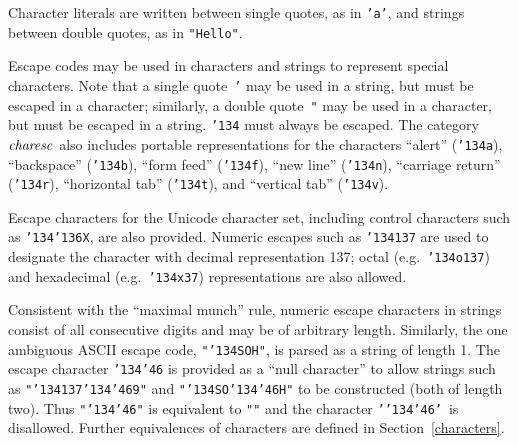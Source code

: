 %
%
%
%
%
%
%
%
%
%
%
%
%
%
%

Character literals are written between single quotes, as in
\mbox{\tt 'a'}, and strings between double quotes, as in \mbox{\tt "Hello"}.

Escape codes may be used in characters and strings to represent
special characters.  Note that a single quote~\mbox{\tt '} may be used in a string, but
must be escaped in a character; similarly, a double quote~\mbox{\tt "} may be used in a
character, but must be escaped in a string.  \mbox{\tt {\char'134}} must always be
escaped.  The category \mbox{$\it charesc$} also includes portable
representations for the characters ``alert'' (\mbox{\tt {\char'134}a}), ``backspace''
(\mbox{\tt {\char'134}b}), ``form feed'' (\mbox{\tt {\char'134}f}), ``new line'' (\mbox{\tt {\char'134}n}), ``carriage return''
(\mbox{\tt {\char'134}r}), ``horizontal tab'' (\mbox{\tt {\char'134}t}), and ``vertical tab'' (\mbox{\tt {\char'134}v}).

Escape characters for the Unicode character
set, including
control characters such as \mbox{\tt {\char'134}{\char'136}X}, are also provided.
Numeric escapes such as \mbox{\tt {\char'134}137} are used to designate the character
with decimal representation 137; octal
(e.g.~\mbox{\tt {\char'134}o137}) and hexadecimal (e.g.~\mbox{\tt {\char'134}x37}) representations are also
allowed.  

Consistent with the ``maximal munch'' rule,
numeric escape
characters in strings consist of all consecutive digits and may
be of arbitrary length.  Similarly, the one ambiguous ASCII escape
code, \mbox{\tt "{\char'134}SOH"}, is parsed as a string of length 1.  The escape
character \mbox{\tt {\char'134}{\char'46}} is provided as a ``null character'' to allow strings
such as \mbox{\tt "{\char'134}137{\char'134}{\char'46}9"} and \mbox{\tt "{\char'134}SO{\char'134}{\char'46}H"} to be constructed (both of length
two).  Thus \mbox{\tt "{\char'134}{\char'46}"} is equivalent to \mbox{\tt ""} and the character
\mbox{\tt '{\char'134}{\char'46}'}\ is disallowed.  Further equivalences of characters
are defined in Section~\ref{characters}.

